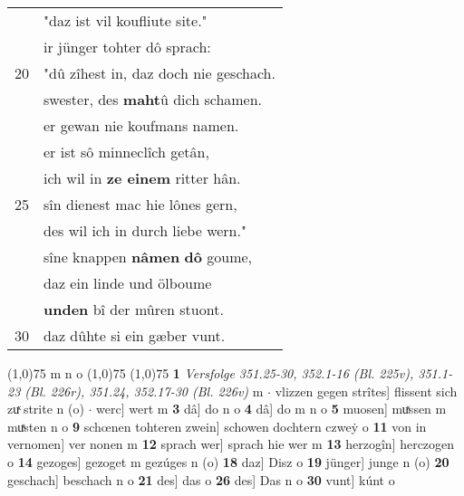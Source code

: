 \documentclass[8pt,a4paper,notitlepage]{article}
\begin{document}
\begin{table}[ht]
\begin{minipage}[t]{0.5\linewidth}
\begin{tabular}{rl}
 & "daz ist vil koufliute site."\\ 
 & ir jünger tohter dô sprach:\\ 
20 & "dû zîhest in, daz doch nie geschach.\\ 
 & swester, des \textbf{maht}û dich schamen.\\ 
 & er gewan nie koufmans namen.\\ 
 & er ist sô minneclîch getân,\\ 
 & ich wil in \textbf{ze einem} ritter hân.\\ 
25 & sîn dienest mac hie lônes gern,\\ 
 & des wil ich in durch liebe wern."\\ 
 & sîne knappen \textbf{nâmen} \textbf{dô} goume,\\ 
 & daz ein linde und ölboume\\ 
 & \textbf{unden} bî der mûren stuont.\\ 
30 & daz dûhte si ein gæber vunt.\\ 
\end{tabular}
\scriptsize
\line(1,0){75} \newline
m n o \newline
\line(1,0){75} \newline
\newline
\line(1,0){75} \newline
\textbf{1} \textit{Versfolge 351.25-30, 352.1-16 (Bl. 225v), 351.1-23 (Bl. 226r), 351.24, 352.17-30 (Bl. 226v)} m   $\cdot$ vlizzen gegen strîtes] flissent sich zuͯ strite n (o)  $\cdot$ werc] wert m \textbf{3} dâ] do n o \textbf{4} dâ] do m n o \textbf{5} muosen] muͯssen m muͯsten n o \textbf{9} schœnen tohteren zwein] schowen dochtern czweẏ o \textbf{11} von in vernomen] ver nonen m \textbf{12} sprach wer] sprach hie wer m \textbf{13} herzogîn] herczogen o \textbf{14} gezoges] gezoget m gezúges n (o) \textbf{18} daz] Disz o \textbf{19} jünger] junge n (o) \textbf{20} geschach] beschach n o \textbf{21} des] das o \textbf{26} des] Das n o \textbf{30} vunt] kúnt o \newline
\end{minipage}
\end{table}
\newpage
\end{document}
